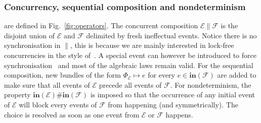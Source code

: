 \documentclass{llncs}
\newcommand{\EE}{\mathcal{E}}
\newcommand{\FF}{\mathcal{F}}
\newcommand{\init}{\mathbf{in}}
\newcommand{\<}{\langle}
\renewcommand{\>}{\rangle}
\newcommand{\exit}{\Phi}
\begin{document}
\subsubsection*{Concurrency, sequential composition and nondeterminism~\cite{Kat96}} are defined in Fig.~\ref{fig:operators}. The concurrent composition $\EE\|\FF$ is the disjoint union of $\EE$ and $\FF$ delimited by fresh ineffectual events. Notice there is no synchronisation in $\|$, this is because we are mainly interested in lock-free concurrencies in the style of~\cite{Hoa09,Jon12,Jon81,Din02}. A special event can however be introduced to force synchronisation~\cite{Kat96,Gor97} and most of the algebraic laws remain valid. For the sequential composition, new bundles of the form $\exit_\EE\mapsto e$ for every $e\in\init(\FF)$ are added to make sure that all events of $\EE$ precede all events of $\FF$. For nondeterminism, the property $\init(\EE)\#\init(\FF)$ is imposed so that the occurrence of any initial event of $\EE$ will block every events of $\FF$ from happening (and symmetrically). The choice is resolved as soon as one event from $\EE$ or $\FF$ happens.
\end{document}
